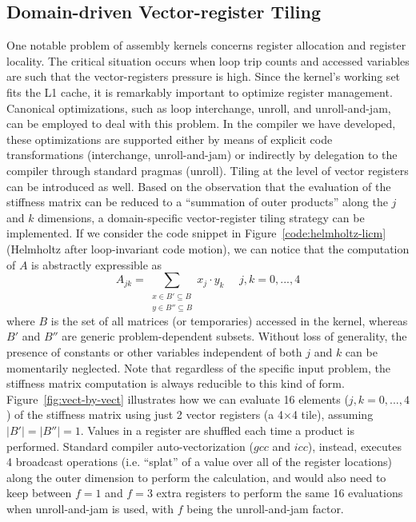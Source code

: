 \documentclass[conference]{IEEEtran}
\begin{document}
\subsection{Domain-driven Vector-register Tiling}
One notable problem of assembly kernels concerns register allocation and register locality. The critical situation occurs when loop trip counts and accessed variables are such that the vector-registers pressure is high. Since the kernel's working set fits the L1 cache, it is remarkably important to optimize register management. Canonical optimizations, such as loop interchange, unroll, and unroll-and-jam, can be employed to deal with this problem. In the compiler we have developed, these optimizations are supported either by means of explicit code transformations (interchange, unroll-and-jam) or indirectly by delegation to the compiler through standard pragmas (unroll). Tiling at the level of vector registers can be introduced as well. Based on the observation that the evaluation of the stiffness matrix can be reduced to a ``summation of outer products'' along the $j$ and $k$ dimensions, a domain-specific vector-register tiling strategy can be implemented. If we consider the code snippet in Figure~\ref{code:helmholtz-licm} (Helmholtz after loop-invariant code motion), we can notice that the computation of $A$ is abstractly expressible as
\begin{equation}
\label{outer-product}
A_{jk} = \sum_{\substack{
  x \in B' \subseteq B \\ 
  y \in B'' \subseteq B}} 
x_j\cdot y_k ~~~~~~ j,k = 0,...,4
\end{equation}
where $B$ is the set of all matrices (or temporaries) accessed in the kernel, whereas $B'$ and $B''$ are generic problem-dependent subsets. Without loss of generality, the presence of constants or other variables independent of both $j$ and $k$ can be momentarily neglected. Note that regardless of the specific input problem, the stiffness matrix computation is always reducible to this kind of form. Figure~\ref{fig:vect-by-vect} illustrates how we can evaluate 16 elements ($j,k=0,...,4$) of the stiffness matrix using just 2 vector registers (a 4$\times$4 tile), assuming $\vert B' \vert = \vert B'' \vert = 1$. Values in a register are shuffled each time a product is performed. Standard compiler auto-vectorization ($gcc$ and $icc$), instead, executes 4 broadcast operations (i.e. ``splat'' of a value over all of the register locations) along the outer dimension to perform the calculation, and would also need to keep between $f=1$ and $f=3$ extra registers to perform the same 16 evaluations when unroll-and-jam is used, with $f$ being the unroll-and-jam factor. 
\end{document}
